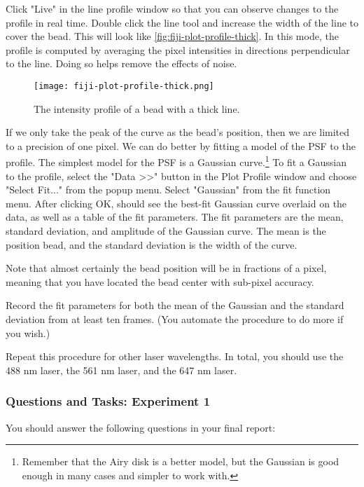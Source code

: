 \documentclass[10pt,a4paper,oneside]{book}
\begin{document}
Click "Live" in the line profile window so that you can observe changes to the profile in real time. Double click the line tool and increase the width of the line to cover the bead. This will look like \autoref{fig:fiji-plot-profile-thick}. In this mode, the profile is computed by averaging the pixel intensities in directions perpendicular to the line. Doing so helps remove the effects of noise.

\begin{figure}[ht]
    \centering
    \texttt{[image: fiji-plot-profile-thick.png]}
    \caption{The intensity profile of a bead with a thick line.}
    \label{fig:fiji-plot-profile-thick}
\end{figure}

If we only take the peak of the curve as the bead's position, then we are limited to a precision of one pixel. We can do better by fitting a model of the PSF to the profile. The simplest model for the PSF is a Gaussian curve.\footnote{Remember that the Airy disk is a better model, but the Gaussian is good enough in many cases and simpler to work with.} To fit a Gaussian to the profile, select the "Data \textgreater \textgreater" button in the Plot Profile window and choose "Select Fit..." from the popup menu. Select "Gaussian" from the fit function menu. After clicking OK, should see the best-fit Gaussian curve overlaid on the data, as well as a table of the fit parameters. The fit parameters are the mean, standard deviation, and amplitude of the Gaussian curve. The mean is the position bead, and the standard deviation is the width of the curve.

Note that almost certainly the bead position will be in fractions of a pixel, meaning that you have located the bead center with sub-pixel accuracy.

Record the fit parameters for both the mean of the Gaussian and the standard deviation from at least ten frames. (You automate the procedure to do more if you wish.)

Repeat this procedure for other laser wavelengths. In total, you should use the 488 nm laser, the 561 nm laser, and the 647 nm laser.

\subsubsection{Questions and Tasks: Experiment 1}

You should answer the following questions in your final report:
\end{document}
